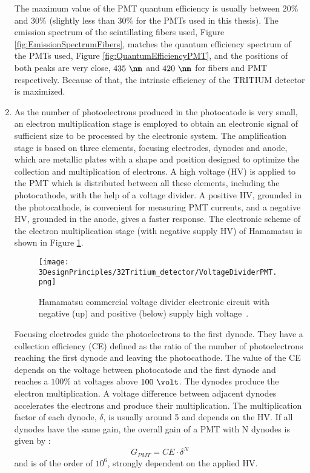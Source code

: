 \begin{enumerate}
The maximum value of the PMT quantum efficiency is usually between $20\%$ and $30\%$ \cite{Knoll} (slightly less than $30\%$ for the PMTs used in this thesis). The emission spectrum of the scintillating fibers used, Figure \ref{fig:EmissionSpectrumFibers}, matches the quantum efficiency spectrum of the PMTs used, Figure \ref{fig:QuantumEfficiencyPMT}, and the positions of both peaks are very close, $435~\nm$ and $420~\nm$ for fibers and PMT respectively. Because of that, the intrinsic efficiency of the TRITIUM detector is maximized.

\item{} As the number of photoelectrons produced in the photocatode is very small, an electron multiplication stage is employed to obtain an electronic signal of sufficient size to be processed by the electronic system. The amplification stage is based on three elements, focusing electrodes, dynodes and anode, which are metallic plates with a shape and position designed to optimize the collection and multiplication of electrons. A high voltage (HV) is applied to the PMT which is distributed between all these elements, including the photocathode, with the help of a voltage divider. A positive HV, grounded in the photocathode, is convenient for measuring PMT currents, and a negative HV, grounded in the anode, gives a faster response. The electronic scheme of the electron multiplication stage (with negative supply HV) of Hamamatsu is shown in Figure \ref{fig:VoltageDividerCircuit}.

\begin{figure}[h]
\centering
\texttt{[image: 3DesignPrinciples/32Tritium\_detector/VoltageDividerPMT.png]}
\caption{Hamamatsu commercial voltage divider electronic circuit with negative (up) and positive (below) supply high voltage\label{fig:VoltageDividerCircuit}~\cite{DataSheetPMTs}.}
\end{figure}


Focusing electrodes guide the photoelectrons to the first dynode. They have a collection efficiency (CE) defined as the ratio of the number of photoelectrons reaching the first dynode and leaving the photocathode. The value of the CE depends on the voltage between photocatode and the first dynode and reaches a $100\%$ at voltages above $100~\volt$. The dynodes produce the electron multiplication. A voltage difference between adjacent dynodes accelerates the electrons and produce their multiplication. The multiplication factor of each dynode, $\delta$, is usually around 5 and depends on the HV. If all dynodes have the same gain, the overall gain of a PMT with N dynodes is given by \cite{Knoll}:
\begin{equation}
G_{PMT} = CE\cdot{} \delta^N
\label{eq:PMTGain}
\end{equation}
and is of the order of $10^6$, strongly dependent on the applied HV.


\end{enumerate}
